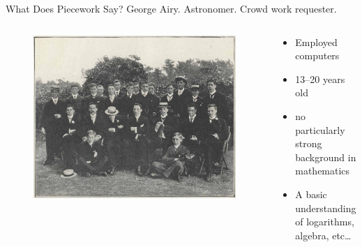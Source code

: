 \documentclass[presentation]{subfiles}
\begin{document}
\begin{frame}[t]{What Does Piecework Say?}
      George Airy. Astronomer. Crowd work requester.\par
      \scriptsize{\textcite{grier2013computers}\par}\normalsize{}
    \begin{columns}
    \begin{column}{0.6\textwidth}
      \begin{figure}
        \includegraphics[max width=\textwidth, max height=.7\textheight,keepaspectratio]{figures/photo/Greenwich-Observatory-computing-staff-1902.jpg}
      \end{figure}
    \end{column}
    
    \begin{column}{0.4\textwidth}
      \begin{itemize}
        \item Employed computers
        \item 13--20 years old
        \item no particularly strong background in mathematics
        \item A basic understanding of logarithms, algebra, etc\dots
      \end{itemize}
    \end{column}
    \end{columns}

\end{frame}
\end{document}
